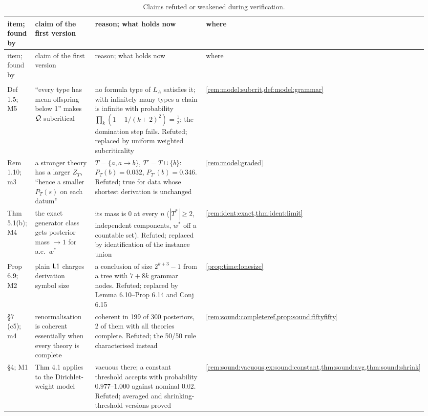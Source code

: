 {\footnotesize
\begin{longtable}{@{}>{\raggedright\arraybackslash}p{1.9cm}>{\raggedright\arraybackslash}p{4.3cm}>{\raggedright\arraybackslash}p{6.1cm}>{\raggedright\arraybackslash}p{2.6cm}@{}}
\caption{Claims refuted or weakened during verification.}\label{tab:ver:corrections}\\
\toprule
item; found by & claim of the first version & reason; what holds now & where\\
\midrule
\endfirsthead
\toprule
item; found by & claim of the first version & reason; what holds now & where\\
\midrule
\endhead
\bottomrule
\endfoot
\multicolumn{4}{@{}l}{\emph{model track}}\\
Def 1.5; M5 & ``every type has mean offspring below 1'' makes $\mathcal{Q}$ subcritical & no formula type of $L_A$ satisfies it; with infinitely many types a chain is infinite with probability $\prod_k(1-1/(k+2)^2)=\frac12$; the domination step fails. Refuted; replaced by uniform weighted subcriticality & \cref{rem:model:subcrit,def:model:grammar}\\
Rem 1.10; m3 & a stronger theory has a larger $Z_T$, ``hence a smaller $P_T(s)$ on each datum'' & $T=\{a,a\to b\}$, $T'=T\cup\{b\}$: $P_T(b)=0.032$, $P_{T'}(b)=0.346$. Refuted; true for data whose shortest derivation is unchanged & \cref{rem:model:graded}\\
Thm 5.1(b); M4 & the exact generator class gets posterior mass $\to1$ for a.e.\ $w^*$ & its mass is $0$ at every $n$ ($|T^*|\ge2$, independent components, $w^*$ off a countable set). Refuted; replaced by identification of the instance union & \cref{rem:ident:exact,thm:ident:limit}\\
Prop 6.9; M2 & plain $\mathord{\mathsf{L1}}$ charges derivation symbol size & a conclusion of size $2^{k+3}-1$ from a tree with $7+8k$ grammar nodes. Refuted; replaced by Lemma 6.10--Prop 6.14 and Conj 6.15 & \cref{prop:time:lonesize}\\
\S7 (c5); m4 & renormalisation is coherent essentially when every theory is complete & coherent in 199 of 300 posteriors, 2 of them with all theories complete. Refuted; the 50/50 rule characterised instead & \cref{rem:sound:completeref,prop:sound:fiftyfifty}\\
\S4; M1 & Thm 4.1 applies to the Dirichlet-weight model & vacuous there; a constant threshold accepts with probability $0.977$--$1.000$ against nominal $0.02$. Refuted; averaged and shrinking-threshold versions proved & \cref{rem:sound:vacuous,ex:sound:constant,thm:sound:avg,thm:sound:shrink}\\

\end{longtable}}

